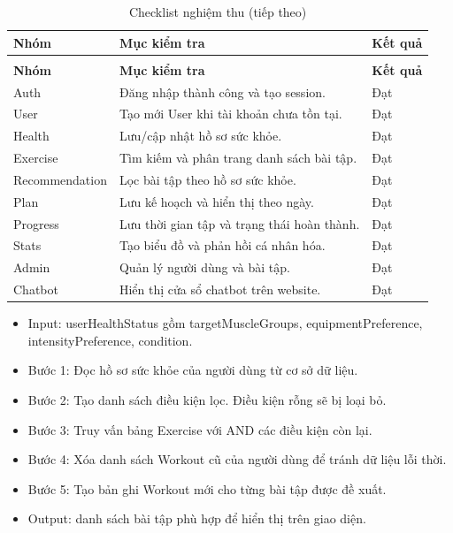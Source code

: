 \begingroup
\setlength{\tabcolsep}{3pt}
\renewcommand{\arraystretch}{1.25}
\begin{longtable}{|P{0.220\textwidth}|P{0.330\textwidth}|P{0.370\textwidth}|}
\caption{Checklist nghiệm thu}\\
\hline
\textbf{Nhóm} & \textbf{Mục kiểm tra} & \textbf{Kết quả} \\
\hline
\endfirsthead
\caption[]{Checklist nghiệm thu (tiếp theo)}\\
\hline
\textbf{Nhóm} & \textbf{Mục kiểm tra} & \textbf{Kết quả} \\
\hline
\endhead
Auth & Đăng nhập thành công và tạo session. & Đạt \\
\hline
User & Tạo mới User khi tài khoản chưa tồn tại. & Đạt \\
\hline
Health & Lưu/cập nhật hồ sơ sức khỏe. & Đạt \\
\hline
Exercise & Tìm kiếm và phân trang danh sách bài tập. & Đạt \\
\hline
Recommendation & Lọc bài tập theo hồ sơ sức khỏe. & Đạt \\
\hline
Plan & Lưu kế hoạch và hiển thị theo ngày. & Đạt \\
\hline
Progress & Lưu thời gian tập và trạng thái hoàn thành. & Đạt \\
\hline
Stats & Tạo biểu đồ và phản hồi cá nhân hóa. & Đạt \\
\hline
Admin & Quản lý người dùng và bài tập. & Đạt \\
\hline
Chatbot & Hiển thị cửa sổ chatbot trên website. & Đạt \\
\hline
\end{longtable}
\endgroup


\begin{itemize}

    \item Input: userHealthStatus gồm targetMuscleGroups, equipmentPreference, intensityPreference, condition.

    \item Bước 1: Đọc hồ sơ sức khỏe của người dùng từ cơ sở dữ liệu.

    \item Bước 2: Tạo danh sách điều kiện lọc. Điều kiện rỗng sẽ bị loại bỏ.

    \item Bước 3: Truy vấn bảng Exercise với AND các điều kiện còn lại.

    \item Bước 4: Xóa danh sách Workout cũ của người dùng để tránh dữ liệu lỗi thời.

    \item Bước 5: Tạo bản ghi Workout mới cho từng bài tập được đề xuất.

    \item Output: danh sách bài tập phù hợp để hiển thị trên giao diện.

\end{itemize}

